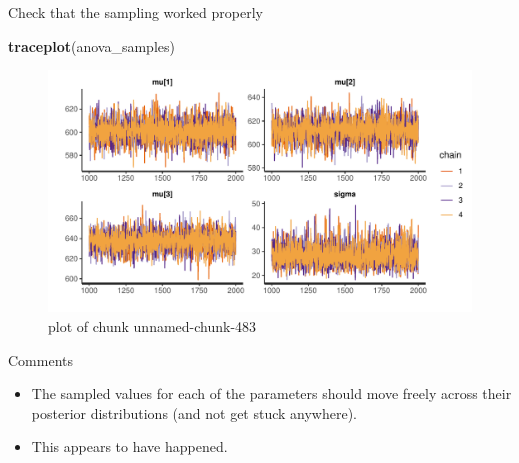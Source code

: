 \documentclass[
  ignorenonframetext,
]{beamer}
\newenvironment{Shaded}{\begin{snugshade}}{\end{snugshade}}
\newcommand{\KeywordTok}[1]{\textcolor[rgb]{0.13,0.29,0.53}{\textbf{#1}}}
\newcommand{\NormalTok}[1]{#1}
\providecommand{\tightlist}{%
  \setlength{\itemsep}{0pt}\setlength{\parskip}{0pt}}
\begin{document}
\begin{frame}[fragile]{Check that the sampling worked properly}
\protect\hypertarget{check-that-the-sampling-worked-properly}{}

\begin{Shaded}
\begin{Highlighting}[]
\KeywordTok{traceplot}\NormalTok{(anova_samples)}
\end{Highlighting}
\end{Shaded}

\begin{figure}
\centering
\includegraphics{figure/unnamed-chunk-483-1.pdf}
\caption{plot of chunk unnamed-chunk-483}
\end{figure}

\end{frame}

\begin{frame}{Comments}
\protect\hypertarget{comments-30}{}

\begin{itemize}
\tightlist
\item
  The sampled values for each of the parameters should move freely
  across their posterior distributions (and not get stuck anywhere).
\item
  This appears to have happened.
\end{itemize}

\end{frame}
\end{document}
